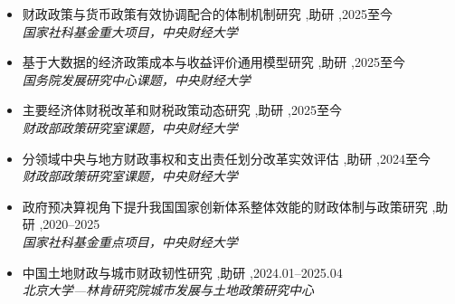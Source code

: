 \documentclass[a4paper,10pt]{article}
\begin{document}
\begin{itemize}

\item 财政政策与货币政策有效协调配合的体制机制研究 \sep 助研 \sep 2025至今\\
  {\color{gray}\textit{国家社科基金重大项目，中央财经大学}}

\item 基于大数据的经济政策成本与收益评价通用模型研究 \sep 助研 \sep 2025至今\\
  {\color{gray}\textit{国务院发展研究中心课题，中央财经大学}}

\item 主要经济体财税改革和财税政策动态研究 \sep 助研 \sep 2025至今\\
  {\color{gray}\textit{财政部政策研究室课题，中央财经大学}}

\item 分领域中央与地方财政事权和支出责任划分改革实效评估 \sep 助研 \sep 2024至今\\
  {\color{gray}\textit{财政部政策研究室课题，中央财经大学}}

\item 政府预决算视角下提升我国国家创新体系整体效能的财政体制与政策研究 \sep 助研 \sep 2020--2025\\
  {\color{gray}\textit{国家社科基金重点项目，中央财经大学}}

\item 中国土地财政与城市财政韧性研究 \sep 助研 \sep 2024.01--2025.04\\
  {\color{gray}\textit{北京大学—林肯研究院城市发展与土地政策研究中心}}

\end{itemize}

\end{document}
